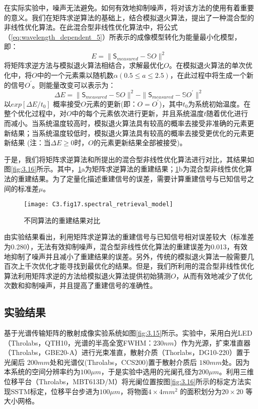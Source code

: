在实际实验中，噪声无法避免。如何有效地抑制噪声，将对该方法的使用有着重要的意义。我们在矩阵求逆算法的基础上，结合模拟退火算法，提出了一种混合型的非线性优化算法。在此混合型非线性优化算法中，将公式（\ref{eq:wavelength_dependent_5}）所表示的成像模型转化为能量最小化模型，即：
\begin{equation}
  E = \| \mathsf{S_{\textit{measured}}}-\mathbb{S}O \|^2
\label{eq:wavelength_dependent_6}
\end{equation}
将矩阵求逆方法与模拟退火算法相结合，求解最优化$O$。在模拟退火算法的单次优化中，将$O$中的一个元素乘以随机数$\alpha (0.5≤a≤2.5)$，在此过程中将生成一个新的信号$O^{\prime}$。则能量改变可以表示为：
\begin{equation}
  \Delta E = \| \mathsf{S_{\textit{measured}}}-\mathbb{S}O \|^2-\| \mathsf{S_{\textit{measured}}}-\mathbb{S}O^{\prime} \|^2
\label{eq:wavelength_dependent_7}
\end{equation}
以$exp[ \Delta E / t_0]$ 概率接受$O$元素的更新(即：$O = O^{\prime}$)，其中$t_0$为系统初始温度。在整个优化过程中，对$O$中的每个元素依次进行更新，并且系统温度$t$随着优化进行而减小。当系统温度较高时，模拟退火算法具有较高的概率去接受非准确的元素更新结果；当系统温度较低时，模拟退火算法具有较高的概率去接受更优化的元素更新结果 (注：当$\Delta E \ge 0 $时，$O$的元素更新结果全部被接受)。

于是，我们将矩阵求逆算法和所提出的混合型非线性优化算法进行对比，其结果如图\ref{fig:3.16}所示。其中，\ref{fig:3.17}a为矩阵求逆算法的重建结果；\ref{fig:3.17}b为混合型非线性优化算法的重建结果。为了定量化描述重建信号的误差，需要计算重建信号与已知信号之间的标准差$\mu$。

\begin{figure}[htp]
	\centering
	\texttt{[image: C3.fig17.spectral\_retrieval\_model]}
	\caption{不同算法的重建结果对比}
	\label{fig:3.17}
\end{figure}

由实验结果看出，利用矩阵求逆算法的重建信号与已知信号相对误差较大（标准差为0.280），无法有效抑制噪声，混合型非线性优化算法的重建误差为0.013，有效地抑制了噪声并且减小了重建结果的误差。另外，传统的模拟退火算法一般需要几百次上千次优化才能寻找到最优化的结果。但是，我们所利用的混合型非线性优化算法利用矩阵求逆的方法给模拟退火算法提供初始猜测$O$，从而有效地减少了优化次数和抑制噪声，并且提高了重建信号的准确性。
\subsection{实验结果}
基于光谱传输矩阵的散射成像实验系统如图\ref{fig:3.15}所示。实验中，采用白光LED（Throlabs，QTH10，光谱的半高全宽FWHM：$230 nm$）作为光源，扩束准直器（Throlabs，GBE20-A）进行光束准直，散射介质（Thorlabs，DG10-220）置于光阑后 $200 mm$处和光谱仪(Throlabs，CCS200)置于散射介质后 $180 mm$处。因为本系统的空间分辨率约为$100 \mu m$，于是实验中选用的光阑孔径为$200 \mu m$。利用三维位移平台（Throlabs，MBT613D/M）将光阑位置按图\ref{fig:3.16}所示的标定方法实现SSTM标定，位移平台步进为$100 \mu m$，将物面$ 4\times 4 mm^2$ 的面积划分为$ 20\times 20$ 等大小网格。

